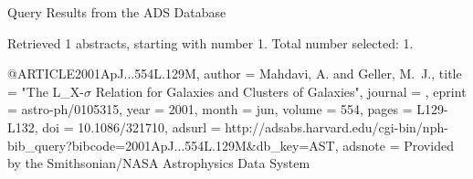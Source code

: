 Query Results from the ADS Database


Retrieved 1 abstracts, starting with number 1.  Total number selected: 1.

@ARTICLE{2001ApJ...554L.129M,
   author = {{Mahdavi}, A. and {Geller}, M.~J.},
    title = "{The L_{X}-{$\sigma$} Relation for Galaxies and Clusters of Galaxies}",
  journal = {\apjl},
   eprint = {astro-ph/0105315},
     year = 2001,
    month = jun,
   volume = 554,
    pages = {L129-L132},
      doi = {10.1086/321710},
   adsurl = {http://adsabs.harvard.edu/cgi-bin/nph-bib_query?bibcode=2001ApJ...554L.129M&db_key=AST},
  adsnote = {Provided by the Smithsonian/NASA Astrophysics Data System}
}



